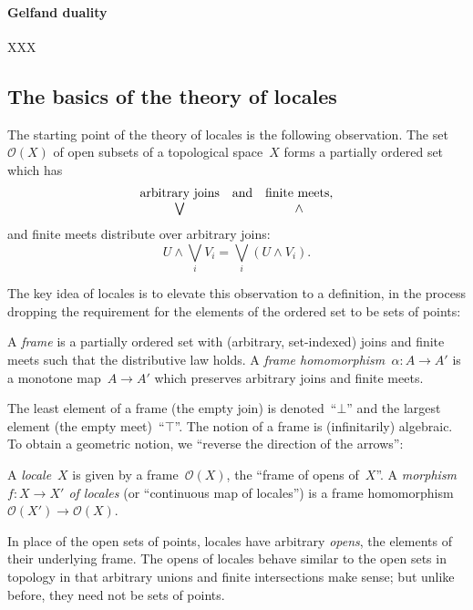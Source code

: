 \documentclass{ws-rv9x6}
\renewcommand{\O}{\mathcal{O}}
\renewcommand{\_}{\mathpunct{.}}
\newcommand{\?}{\,{:}\,}
\begin{document}
\paragraph{Gelfand duality} XXX


\subsection{The basics of the theory of locales}

The starting point of the theory of locales is the following
observation. The set~$\O(X)$ of open subsets of a topological
space~$X$ forms a partially ordered set which has
\[ \begin{array}{@{}ccc@{}}
\text{arbitrary joins}
&\text{and}&
\text{finite meets}, \\
\bigvee && \wedge
\end{array} \]
and finite meets distribute over arbitrary joins:
\[ U \wedge \bigvee_i V_i = \bigvee_i (U \wedge V_i). \]

The key idea of locales is to elevate this observation to a definition, in the
process dropping the requirement for the elements of the ordered set to be sets
of points:
\begin{definition}A \emph{frame} is a partially ordered set with (arbitrary,
set-indexed) joins and finite meets such that the distributive law
holds. A \emph{frame homomorphism~$\alpha : A \to A'$} is a monotone map~$A
\to A'$ which preserves arbitrary joins and finite meets.\end{definition}

The least element of a frame (the empty join) is denoted~``$\bot$'' and the
largest element (the empty meet)~``$\top$''. The notion of a frame is
(infinitarily) algebraic. To obtain a geometric notion, we ``reverse the
direction of the arrows'':

\begin{definition}\label{defn:locale}
A \emph{locale}~$X$ is given by a frame~$\O(X)$, the ``frame
of opens of~$X$''. A \emph{morphism~$f : X \to X'$ of locales} (or ``continuous
map of locales'') is a frame homomorphism~$\O(X') \to \O(X)$.\end{definition}

In place of the open sets of points, locales have arbitrary \emph{opens}, the
elements of their underlying frame. The opens of locales behave similar to the
open sets in topology in that arbitrary unions and finite intersections make
sense; but unlike before, they need not be sets of points.
\end{document}
